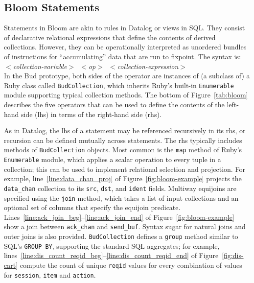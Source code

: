 \subsection{Bloom Statements}
Statements in Bloom are akin to rules in Datalog or views in SQL.  They consist
of declarative relational expressions that define the contents of derived
collections.  However, they can be operationally interpreted as unordered bundles of instructions for ``accumulating'' data that are run to fixpoint.   The syntax is:\\ \noindent
\mbox{\hspace{0.25in}\emph{$<$collection-variable$>$ $<$op$>$
$<$collection-expression$>$}}\\ \noindent In the Bud prototype, both sides of
the operator are instances of (a subclass of) a Ruby class called
\texttt{BudCollection}, which inherits Ruby's built-in \texttt{Enumerable}
module supporting typical collection methods.  The bottom of Figure~\ref{tab:bloom} describes
the five operators that can be used to define the contents of the left-hand
side (lhs) in terms of the right-hand side (rhs).  

As in Datalog, the lhs of a statement may be referenced recursively in its rhs,
or recursion can be defined mutually across statements.  The rhs typically
includes methods of \texttt{BudCollection} objects.  Most common is the
\texttt{map} method of Ruby's \texttt{Enumerable} module, which applies a scalar
operation to every tuple in a collection; this can be used to implement
relational selection and projection. For example, line~\ref{line:data_chan_proj}
of Figure~\ref{fig:bloom-example} projects the \texttt{data\_chan} collection to
its \texttt{src}, \texttt{dst}, and \texttt{ident} fields.  Multiway equijoins
are specified using the \texttt{join} method, which takes a list of input
collections and an optional set of columns that specify the equijoin predicate.
Lines~\ref{line:ack_join_beg}--\ref{line:ack_join_end} of
Figure~\ref{fig:bloom-example} show a join between \texttt{ack\_chan} and
\texttt{send\_buf}. Syntax sugar for natural joins and outer joins is also
provided. \texttt{BudCollection} defines a \texttt{group} method similar to
SQL's \texttt{GROUP BY}, supporting the standard SQL aggregates; for example,
lines~\ref{line:dis_count_reqid_beg}--\ref{line:dis_count_reqid_end} of
Figure~\ref{fig:dis-cart} compute the count of unique \texttt{reqid} values for
every combination of values for \texttt{session}, \texttt{item} and
\texttt{action}.

